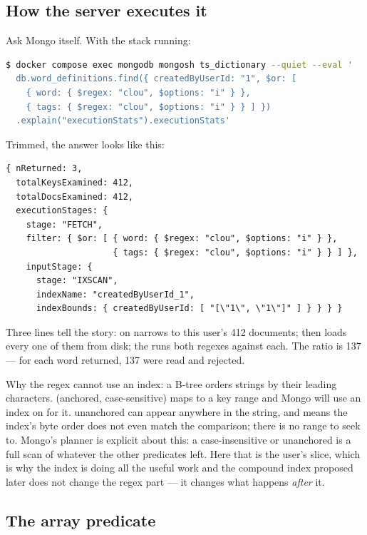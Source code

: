 \subsection{How the server executes it}

Ask Mongo itself. With the stack running:

\begin{handson}
\begin{lstlisting}[language=bash]
$ docker compose exec mongodb mongosh ts_dictionary --quiet --eval '
  db.word_definitions.find({ createdByUserId: "1", $or: [
    { word: { $regex: "clou", $options: "i" } },
    { tags: { $regex: "clou", $options: "i" } } ] })
  .explain("executionStats").executionStats'
\end{lstlisting}
Trimmed, the answer looks like this:
\begin{lstlisting}
{ nReturned: 3,
  totalKeysExamined: 412,
  totalDocsExamined: 412,
  executionStages: {
    stage: "FETCH",
    filter: { $or: [ { word: { $regex: "clou", $options: "i" } },
                     { tags: { $regex: "clou", $options: "i" } } ] },
    inputStage: {
      stage: "IXSCAN",
      indexName: "createdByUserId_1",
      indexBounds: { createdByUserId: [ "[\"1\", \"1\"]" ] } } } }
\end{lstlisting}
Three lines tell the story:  on 
narrows to this user's 412 documents;  then loads every one
of them from disk; the  runs both regexes against each. The
ratio  is 137 --- for each word
returned, 137 were read and rejected.
\end{handson}

Why the regex cannot use an index: a B-tree orders strings by their
leading characters.  (anchored, case-sensitive) maps to a
key range and Mongo will use an index on  for it. 
unanchored can appear anywhere in the string, and  means the
index's byte order does not even match the comparison; there is no range
to seek to. Mongo's planner is explicit about this: a case-insensitive
or unanchored  is a full scan of whatever the other
predicates left. Here that is the user's slice, which is why the
 index is doing all the useful work and the
compound index proposed later does not change the regex part --- it
changes what happens \emph{after} it.

\subsection{The array predicate}

